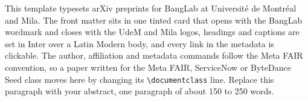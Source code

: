 This template typesets arXiv preprints for BangLab at Université de Montréal and Mila.
The front matter sits in one tinted card that opens with the BangLab wordmark and closes with the UdeM and Mila logos, headings and captions are set in Inter over a Latin Modern body, and every link in the metadata is clickable.
The author, affiliation and metadata commands follow the Meta FAIR convention, so a paper written for the Meta FAIR, ServiceNow or ByteDance Seed class moves here by changing its \texttt{\textbackslash documentclass} line.
Replace this paragraph with your abstract, one paragraph of about 150 to 250 words.
